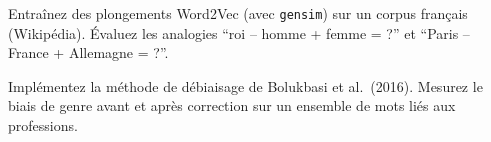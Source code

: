 \begin{exercice}[$\star\star$]
Entra\^inez des plongements Word2Vec (avec \texttt{gensim}) sur un corpus
fran\c{c}ais (Wikip\'edia). \'Evaluez les analogies ``roi -- homme + femme = ?''
et ``Paris -- France + Allemagne = ?''.
\end{exercice}

\begin{exercice}[$\star\star\star$]
Impl\'ementez la m\'ethode de d\'ebiaisage de Bolukbasi et al.\ (2016).
Mesurez le biais de genre avant et apr\`es correction sur un ensemble de
mots li\'es aux professions.
\end{exercice}
